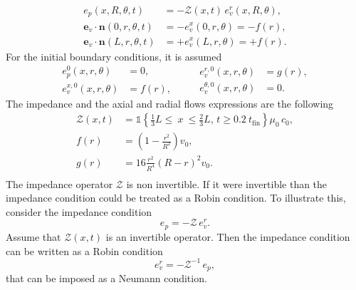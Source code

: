 \begin{align*}
e_p(x, R, \theta, t) &= - \mathcal{Z}(x, t) \, e_v^r(x, R, \theta), \\
\bm{e}_v \cdot \bm{n}(0, r, \theta, t) &= -e_v^x(0, r, \theta) = - f(r), \\
\bm{e}_v \cdot \bm{n}(L, r, \theta, t) &= +e_v^x(L, r, \theta) = + f(r).
\end{align*}
For the initial boundary conditions, it is assumed
\begin{equation}
\label{eq:init_con}
\begin{aligned}
e_p^0(x, r, \theta) &= 0, \\
e_v^{x, 0}(x, r, \theta) &= f(r), 
\end{aligned}  \qquad
\begin{aligned}
e_v^{r, 0}(x, r, \theta) &= g(r), \\
e_v^{\theta, 0}(x, r, \theta) &= 0.
\end{aligned}    
\end{equation}
The impedance and the axial and radial flows expressions are the following
\begin{equation*}
\begin{aligned}
\mathcal{Z}(x, t) &= \mathds{1}\left\{ \frac{1}{3} L \leq \ x \ \leq \frac{2}{3} L, \,  t \geq 0.2 \ t_{\text{fin}} \right\} \mu_0 \, c_0, \\
f(r) &= \left( 1 - \frac{r^2}{R^2} \right) v_0, \\
g(r) &= 16 \frac{r^2}{R^4} \left( R - r \right)^2 v_0. \\
\end{aligned}
\end{equation*}
The impedance operator $\mathcal{Z}$ is non invertible. If it were invertible than the impedance condition could be treated as a Robin condition. To illustrate this, consider the impedance condition
\[
e_p = - \mathcal{Z} \, e_v^r.
\]
Assume that $\mathcal{Z}(x, t)$ is an invertible operator. Then the impedance condition can be written as a Robin condition
\[
e_v^r = - \mathcal{Z}^{-1} \, e_p,
\]
that can be imposed as a Neumann condition. \\


